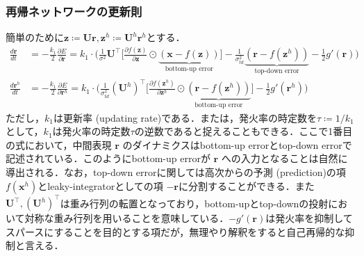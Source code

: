 \subsubsection{再帰ネットワークの更新則}
簡単のために$\mathbf{z}\coloneqq \mathbf{U}\mathbf{r}, \mathbf{z}^h\coloneqq \mathbf{U}^h\mathbf{r}^h$とする．
\begin{align}
\frac{d \mathbf{r}}{d t}&=-\frac{k_{1}}{2} \frac{\partial E}{\partial \mathbf{r}}=k_{1}\cdot\Bigg(\frac{1}{\sigma^{2}} \mathbf{U}^{\top}\bigg[\frac{\partial f(\mathbf{z})}{\partial \mathbf{z}}\odot\underbrace{(\mathbf{x}-f(\mathbf{z}))}_{\text{bottom-up error}}\bigg]-\frac{1}{\sigma_{t d}^{2}}\underbrace{\left(\mathbf{r}-f(\mathbf{z}^h)\right)}_{\text{top-down error}}-\frac{1}{2}g'(\mathbf{r})\Bigg)\\
\frac{d \mathbf{r}^h}{d t}&=-\frac{k_{1}}{2} \frac{\partial E}{\partial \mathbf{r}^h}=k_{1}\cdot\Bigg(\frac{1}{\sigma_{t d}^{2}}(\mathbf{U}^h)^\top\bigg[\frac{\partial f(\mathbf{z}^h)}{\partial \mathbf{z}^h}\odot\underbrace{\left(\mathbf{r}-f(\mathbf{z}^h)\right)}_{\text{bottom-up error}}\bigg]-\frac{1}{2}g'(\mathbf{r}^h)\Bigg)
\end{align}
ただし，$k_1$は更新率 (updating rate)である．または，発火率の時定数を$\tau\coloneqq 1/k_1$として，$k_1$は発火率の時定数$\tau$の逆数であると捉えることもできる．ここで1番目の式において，中間表現 $\mathbf{r}$ のダイナミクスはbottom-up errorとtop-down errorで記述されている．このようにbottom-up errorが $\mathbf{r}$ への入力となることは自然に導出される．なお，top-down errorに関しては高次からの予測 (prediction)の項 $f(\mathbf{x}^h)$とleaky-integratorとしての項 $-\mathbf{r}$に分割することができる．また$\mathbf{U}^\top, (\mathbf{U}^h)^\top$は重み行列の転置となっており，bottom-upとtop-downの投射において対称な重み行列を用いることを意味している．$-g'(\mathbf{r})$は発火率を抑制してスパースにすることを目的とする項だが，無理やり解釈をすると自己再帰的な抑制と言える．
